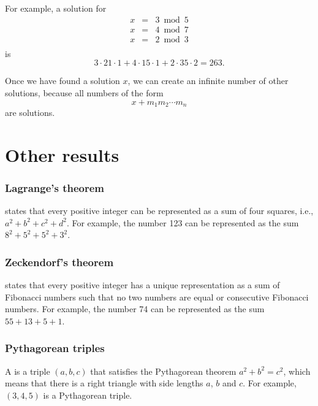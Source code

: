 For example, a solution for
\[
\begin{array}{lcl}
x & = & 3 \bmod 5 \\
x & = & 4 \bmod 7 \\
x & = & 2 \bmod 3 \\
\end{array}
\]
is
\[ 3 \cdot 21 \cdot 1 + 4 \cdot 15 \cdot 1 + 2 \cdot 35 \cdot 2 = 263.\]

Once we have found a solution $x$,
we can create an infinite number of other solutions,
because all numbers of the form
\[x+m_1 m_2 \cdots m_n\]
are solutions.

\section{Other results}

\subsubsection{Lagrange's theorem}


 states that every positive integer
can be represented as a sum of four squares, i.e.,
$a^2+b^2+c^2+d^2$.
For example, the number 123 can be represented
as the sum $8^2+5^2+5^2+3^2$.

\subsubsection{Zeckendorf's theorem}


 states that every
positive integer has a unique representation
as a sum of Fibonacci numbers such that
no two numbers are equal or consecutive
Fibonacci numbers.
For example, the number 74 can be represented
as the sum $55+13+5+1$.

\subsubsection{Pythagorean triples}


A  is a triple $(a,b,c)$
that satisfies the Pythagorean theorem
$a^2+b^2=c^2$, which means that there is a right triangle
with side lengths $a$, $b$ and $c$.
For example, $(3,4,5)$ is a Pythagorean triple.


